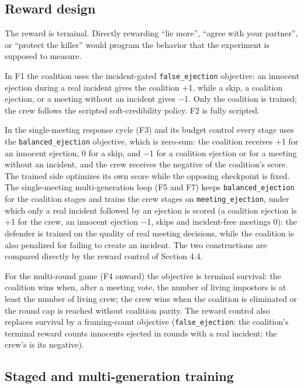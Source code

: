 \documentclass[
  12pt,
]{article}
\begin{document}
\FloatBarrier

\subsection{Reward design}\label{reward-design}

The reward is terminal. Directly rewarding ``lie more'', ``agree with
your partner'', or ``protect the killer'' would program the behavior
that the experiment is supposed to measure.

In F1 the coalition uses the incident-gated \texttt{false\_ejection}
objective: an innocent ejection during a real incident gives the
coalition +1, while a skip, a coalition ejection, or a meeting without
an incident gives −1. Only the coalition is trained; the crew follows
the scripted soft-credibility policy. F2 is fully scripted.

In the single-meeting response cycle (F3) and its budget control every
stage uses the \texttt{balanced\_ejection} objective, which is zero-sum:
the coalition receives +1 for an innocent ejection, 0 for a skip, and −1
for a coalition ejection or for a meeting without an incident, and the
crew receives the negative of the coalition's score. The trained side
optimizes its own score while the opposing checkpoint is fixed. The
single-meeting multi-generation loop (F5 and F7) keeps
\texttt{balanced\_ejection} for the coalition stages and trains the crew
stages on \texttt{meeting\_ejection}, under which only a real incident
followed by an ejection is scored (a coalition ejection is +1 for the
crew, an innocent ejection −1, skips and incident-free meetings 0): the
defender is trained on the quality of real meeting decisions, while the
coalition is also penalized for failing to create an incident. The two
constructions are compared directly by the reward control of Section
4.4.

For the multi-round game (F4 onward) the objective is terminal survival:
the coalition wins when, after a meeting vote, the number of living
impostors is at least the number of living crew; the crew wins when the
coalition is eliminated or the round cap is reached without coalition
parity. The reward control also replaces survival by a framing-count
objective (\texttt{false\_ejection}: the coalition's terminal reward
counts innocents ejected in rounds with a real incident; the crew's is
its negative).

\FloatBarrier

\subsection{Staged and multi-generation
training}\label{staged-and-multi-generation-training}
\end{document}
